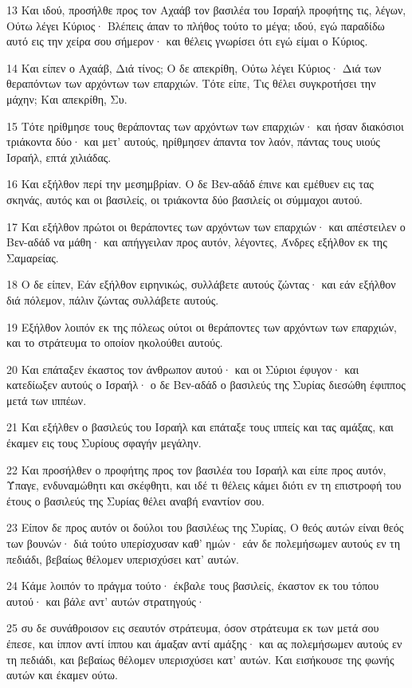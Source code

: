 \par 13 Και ιδού, προσήλθε προς τον Αχαάβ τον βασιλέα του Ισραήλ προφήτης τις, λέγων, Ούτω λέγει Κύριος· Βλέπεις άπαν το πλήθος τούτο το μέγα; ιδού, εγώ παραδίδω αυτό εις την χείρα σου σήμερον· και θέλεις γνωρίσει ότι εγώ είμαι ο Κύριος.
\par 14 Και είπεν ο Αχαάβ, Διά τίνος; Ο δε απεκρίθη, Ούτω λέγει Κύριος· Διά των θεραπόντων των αρχόντων των επαρχιών. Τότε είπε, Τις θέλει συγκροτήσει την μάχην; Και απεκρίθη, Συ.
\par 15 Τότε ηρίθμησε τους θεράποντας των αρχόντων των επαρχιών· και ήσαν διακόσιοι τριάκοντα δύο· και μετ' αυτούς, ηρίθμησεν άπαντα τον λαόν, πάντας τους υιούς Ισραήλ, επτά χιλιάδας.
\par 16 Και εξήλθον περί την μεσημβρίαν. Ο δε Βεν-αδάδ έπινε και εμέθυεν εις τας σκηνάς, αυτός και οι βασιλείς, οι τριάκοντα δύο βασιλείς οι σύμμαχοι αυτού.
\par 17 Και εξήλθον πρώτοι οι θεράποντες των αρχόντων των επαρχιών· και απέστειλεν ο Βεν-αδάδ να μάθη· και απήγγειλαν προς αυτόν, λέγοντες, Άνδρες εξήλθον εκ της Σαμαρείας.
\par 18 Ο δε είπεν, Εάν εξήλθον ειρηνικώς, συλλάβετε αυτούς ζώντας· και εάν εξήλθον διά πόλεμον, πάλιν ζώντας συλλάβετε αυτούς.
\par 19 Εξήλθον λοιπόν εκ της πόλεως ούτοι οι θεράποντες των αρχόντων των επαρχιών, και το στράτευμα το οποίον ηκολούθει αυτούς.
\par 20 Και επάταξεν έκαστος τον άνθρωπον αυτού· και οι Σύριοι έφυγον· και κατεδίωξεν αυτούς ο Ισραήλ· ο δε Βεν-αδάδ ο βασιλεύς της Συρίας διεσώθη έφιππος μετά των ιππέων.
\par 21 Και εξήλθεν ο βασιλεύς του Ισραήλ και επάταξε τους ιππείς και τας αμάξας, και έκαμεν εις τους Συρίους σφαγήν μεγάλην.
\par 22 Και προσήλθεν ο προφήτης προς τον βασιλέα του Ισραήλ και είπε προς αυτόν, Ύπαγε, ενδυναμώθητι και σκέφθητι, και ιδέ τι θέλεις κάμει διότι εν τη επιστροφή του έτους ο βασιλεύς της Συρίας θέλει αναβή εναντίον σου.
\par 23 Είπον δε προς αυτόν οι δούλοι του βασιλέως της Συρίας, Ο θεός αυτών είναι θεός των βουνών· διά τούτο υπερίσχυσαν καθ' ημών· εάν δε πολεμήσωμεν αυτούς εν τη πεδιάδι, βεβαίως θέλομεν υπερισχύσει κατ' αυτών.
\par 24 Κάμε λοιπόν το πράγμα τούτο· έκβαλε τους βασιλείς, έκαστον εκ του τόπου αυτού· και βάλε αντ' αυτών στρατηγούς·
\par 25 συ δε συνάθροισον εις σεαυτόν στράτευμα, όσον στράτευμα εκ των μετά σου έπεσε, και ίππον αντί ίππου και άμαξαν αντί αμάξης· και ας πολεμήσωμεν αυτούς εν τη πεδιάδι, και βεβαίως θέλομεν υπερισχύσει κατ' αυτών. Και εισήκουσε της φωνής αυτών και έκαμεν ούτω.
